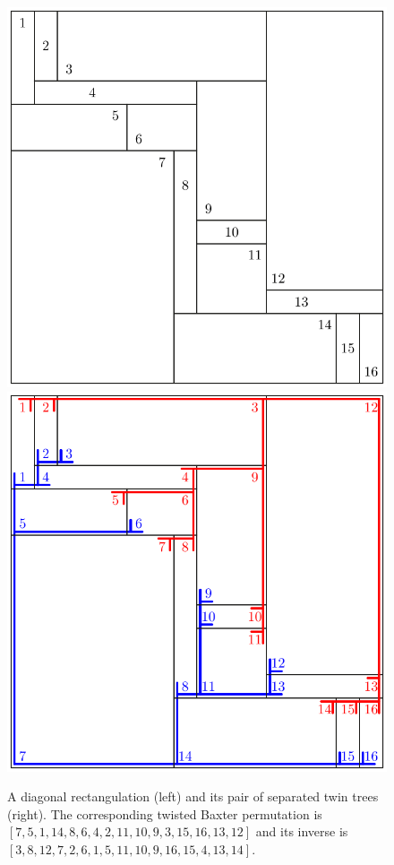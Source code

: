 \documentclass{amsart}
\theoremstyle{definition}
\begin{document}
\begin{figure}
	\centerline{\includegraphics[scale=.7]{weakRectangulation} \qquad \includegraphics[scale=.7]{weakRectangulationTrees}}
	\caption{A diagonal rectangulation (left) and its pair of separated twin trees (right). The corresponding twisted Baxter permutation is $[7, 5, 1, 14, 8, 6, 4, 2, 11, 10, 9, 3, 15, 16, 13, 12]$ and its inverse is $[3, 8, 12, 7, 2, 6, 1, 5, 11, 10, 9, 16, 15, 4, 13, 14]$.}
\end{figure}
\end{document}
